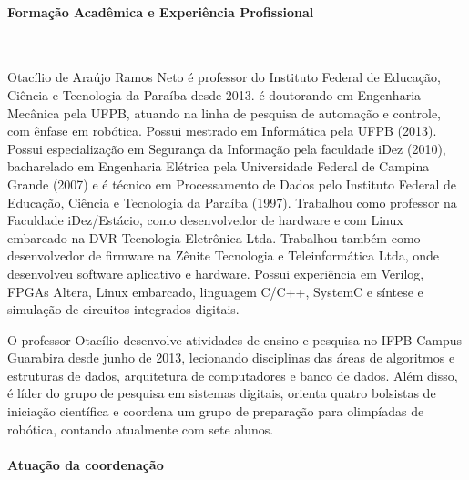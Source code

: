 \paragraph{Forma\c{c}\~ao Acad\^emica e Experi\^encia Profissional}\

Otac\'ilio de Ara\'ujo Ramos Neto \'e professor do Instituto Federal de Educação, Ciência e Tecnologia da Paraíba desde 2013. é doutorando em Engenharia Mecânica pela UFPB, atuando na linha de pesquisa de automação e controle, com ênfase em robótica. Possui mestrado em Informática pela UFPB (2013). Possui especialização em Segurança da Informação pela faculdade iDez (2010), bacharelado em Engenharia Elétrica pela Universidade Federal de Campina Grande (2007) e é técnico em Processamento de Dados pelo Instituto Federal de Educação, Ci\^encia e Tecnologia da Paraíba (1997). Trabalhou como professor na Faculdade iDez/Estácio, como desenvolvedor de hardware e com Linux embarcado na DVR Tecnologia Eletrônica Ltda. Trabalhou também como desenvolvedor de firmware na Zênite Tecnologia e Teleinformática Ltda, onde desenvolveu software aplicativo e hardware. Possui experiência em Verilog, FPGAs Altera, Linux embarcado, linguagem C/C++, SystemC e síntese e simulação de circuitos integrados digitais. 

O professor Otacílio desenvolve atividades de ensino e pesquisa no IFPB-Campus Guarabira desde junho de 2013, lecionando disciplinas das áreas de algoritmos e estruturas de dados, arquitetura de computadores e banco de dados. Além disso, é líder do grupo de pesquisa em sistemas digitais, orienta quatro bolsistas de iniciação científica e coordena um grupo de preparação para olimpíadas de robótica, contando atualmente com sete alunos.

\paragraph{Atua\c{c}\~ao da coordena\c{c}\~ao}\

